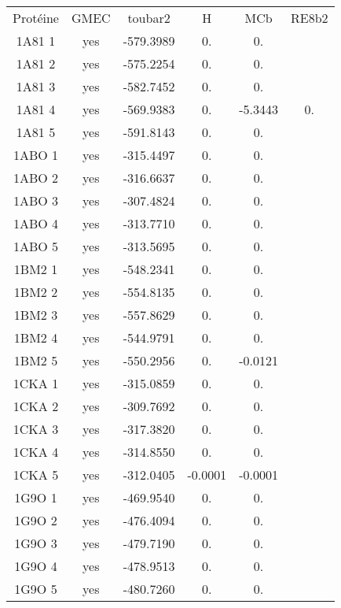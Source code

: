     \begin{table}[h]
      \centering

      \begin{tabular}{cccccc}

        
        \toprule
        Protéine & GMEC & toubar2 & H & MCb & RE8b2 \\
        \cmidrule{1-6}
        1A81 1 & yes &  -579.3989 & 0. & 0. &  \\
        1A81 2 & yes &  -575.2254 & 0. & 0. &  \\
        1A81 3 & yes &  -582.7452 & 0. & 0. &  \\
        1A81 4 & yes &  -569.9383 & 0. & -5.3443 & 0. \\
        1A81 5 & yes &  -591.8143 & 0. & 0. &  \\
        1ABO 1 & yes &  -315.4497 & 0. & 0. &  \\
        1ABO 2 & yes &  -316.6637 & 0. & 0. &  \\
        1ABO 3 & yes &  -307.4824 & 0. & 0. &  \\
        1ABO 4 & yes &  -313.7710 & 0. & 0. &  \\
        1ABO 5 & yes &  -313.5695 & 0. & 0. &  \\
        1BM2 1 & yes &  -548.2341 & 0. & 0. &  \\
        1BM2 2 & yes &  -554.8135 & 0. & 0. &  \\
        1BM2 3 & yes &  -557.8629 & 0. & 0. &  \\
        1BM2 4 & yes &  -544.9791 & 0. & 0. &  \\
        1BM2 5 & yes &  -550.2956 & 0. & -0.0121 &  \\
        1CKA 1 & yes &  -315.0859 & 0. & 0. &  \\
        1CKA 2 & yes &  -309.7692 & 0. & 0. &  \\
        1CKA 3 & yes &  -317.3820 & 0. & 0. &  \\
        1CKA 4 & yes &  -314.8550 & 0. & 0. &  \\
        1CKA 5 & yes &  -312.0405 & -0.0001 & -0.0001 &  \\
        1G9O 1 & yes &  -469.9540 & 0. & 0. &  \\
        1G9O 2 & yes &  -476.4094 & 0. & 0. &  \\
        1G9O 3 & yes &  -479.7190 & 0. & 0. &  \\
        1G9O 4 & yes &  -478.9513 & 0. & 0. &  \\
        1G9O 5 & yes &  -480.7260 & 0. & 0. &  \\

\end{tabular}
\end{table}
